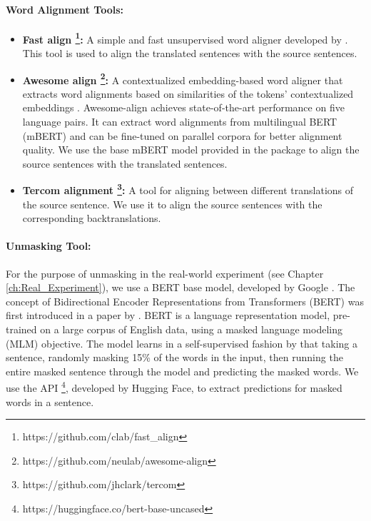 \paragraph{Word Alignment Tools:}
\begin{itemize}
    \item \textbf{Fast align \footnote{https://github.com/clab/fast\_align}:} A simple and fast unsupervised word aligner developed by \citet{fast-align}. This tool is used to align the translated sentences with the source sentences.
    \item \textbf{Awesome align \footnote{https://github.com/neulab/awesome-align}:} A contextualized embedding-based word aligner that extracts word alignments based on similarities of the tokens’ contextualized embeddings \parencite{awesome-align}. Awesome-align achieves state-of-the-art performance on five language pairs. It can extract word alignments from multilingual BERT (mBERT) and can be fine-tuned on parallel corpora for better alignment quality. We use the base mBERT model provided in the package to align the source sentences with the translated sentences.
    \item \textbf{Tercom alignment \footnote{https://github.com/jhclark/tercom}:} A tool for aligning between different translations of the source sentence. We use it to align the source sentences with the corresponding backtranslations.
\end{itemize}

\paragraph{Unmasking Tool:}

For the purpose of unmasking in the real-world experiment (see Chapter \ref{ch:Real_Experiment}), we use a BERT base model, developed by Google \parencite{bert_unmasking}. The concept of Bidirectional Encoder Representations from Transformers (BERT) was first introduced in a paper by \cite{bert}. BERT is a language representation model, pre-trained on a large corpus of English data, using a masked language modeling (MLM) objective. The model learns in a self-supervised fashion by that taking a sentence, randomly masking 15\% of the words in the input, then running the entire masked sentence through the model and predicting the masked words. We use the API \footnote{https://huggingface.co/bert-base-uncased}, developed by Hugging Face, to extract predictions for masked words in a sentence.



